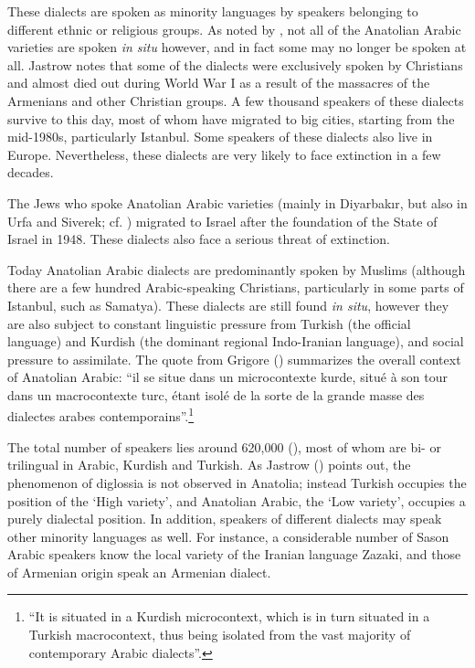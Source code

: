 \documentclass[output=paper]{langsci/langscibook}
\begin{document}
These dialects are spoken as minority languages by speakers belonging to different ethnic or religious groups. As noted by \cite{Jastrow2006}, not all of the Anatolian Arabic varieties are spoken \textit{in situ} however, and in fact some may no longer be spoken at all. Jastrow notes that some of the dialects were exclusively spoken by Christians and almost died out during World War I as a result of the massacres of the Armenians and other Christian groups. A few thousand speakers of these dialects survive to this day, most of whom have migrated to big cities, starting from the mid-1980s, particularly Istanbul. Some speakers of these dialects also live in Europe. Nevertheless, these dialects are very likely to face extinction in a few decades. 

The Jews who spoke Anatolian Arabic varieties (mainly in Diyarbak{\i}r, but also in Urfa and Siverek; cf. \citealt{Nevo1999}) migrated to Israel after the foundation of the State of Israel in 1948. These dialects also face a serious threat of extinction. 

Today Anatolian Arabic dialects are predominantly spoken by Muslims (although there are a few hundred Arabic-speaking Christians, particularly in some parts of Istanbul, such as Samatya). These dialects are still found \textit{in situ}, however they are also subject to constant linguistic pressure from Turkish (the official language) and Kurdish (the dominant regional Indo-Iranian language), and social pressure to assimilate. The quote from Grigore (\citeyear[27]{Grigore2007book}) summarizes the overall context of Anatolian Arabic: ``il se situe dans un microcontexte kurde, situé à son tour dans un macrocontexte turc, étant isolé de la sorte de la grande masse des dialectes arabes contemporains''.\footnote{``It is situated in a Kurdish microcontext, which is in turn situated in a Turkish macrocontext, thus being isolated from the vast majority of contemporary Arabic dialects''.} 

The total number of speakers lies around 620,000 (\citealt[162]{Procházka2018Anatolian}), most of whom are bi- or trilingual in
Arabic, Kurdish and Turkish. As Jastrow (\citeyear[88]{Jastrow2011anatolian}) points out, the phenomenon of diglossia is not observed in Anatolia; instead Turkish occupies the position of the `High variety', and
Anatolian Arabic, the `Low variety', occupies a purely dialectal position. In addition, speakers of
different dialects may speak other minority languages as well. For instance, a considerable number of Sason Arabic speakers know the local variety of the Iranian language Zazaki, and those of Armenian origin speak an Armenian dialect.
\end{document}
